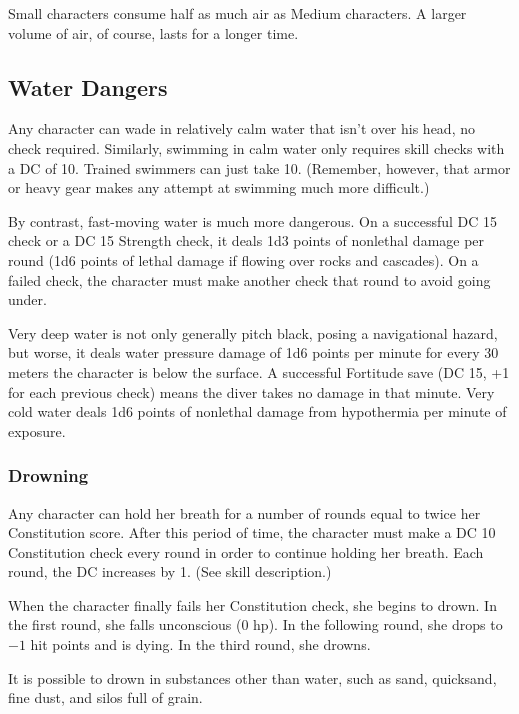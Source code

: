 Small characters consume half as much air as Medium characters. A larger volume of air, of course, lasts for a longer time.

\subsection{Water Dangers}
Any character can wade in relatively calm water that isn't over his head, no check required. Similarly, swimming in calm water only requires skill checks with a DC of 10. Trained swimmers can just take 10. (Remember, however, that armor or heavy gear makes any attempt at swimming much more difficult.)

By contrast, fast-moving water is much more dangerous. On a successful DC 15  check or a DC 15 Strength check, it deals 1d3 points of nonlethal damage per round (1d6 points of lethal damage if flowing over rocks and cascades). On a failed check, the character must make another check that round to avoid going under.

Very deep water is not only generally pitch black, posing a navigational hazard, but worse, it deals water pressure damage of 1d6 points per minute for every 30 meters the character is below the surface. A successful Fortitude save (DC 15, +1 for each previous check) means the diver takes no damage in that minute. Very cold water deals 1d6 points of nonlethal damage from hypothermia per minute of exposure.

\subsubsection{Drowning}
Any character can hold her breath for a number of rounds equal to twice her Constitution score. After this period of time, the character must make a DC 10 Constitution check every round in order to continue holding her breath. Each round, the DC increases by 1. (See  skill description.)

When the character finally fails her Constitution check, she begins to drown. In the first round, she falls unconscious (0 hp). In the following round, she drops to $-1$ hit points and is dying. In the third round, she drowns.

It is possible to drown in substances other than water, such as sand, quicksand, fine dust, and silos full of grain.
